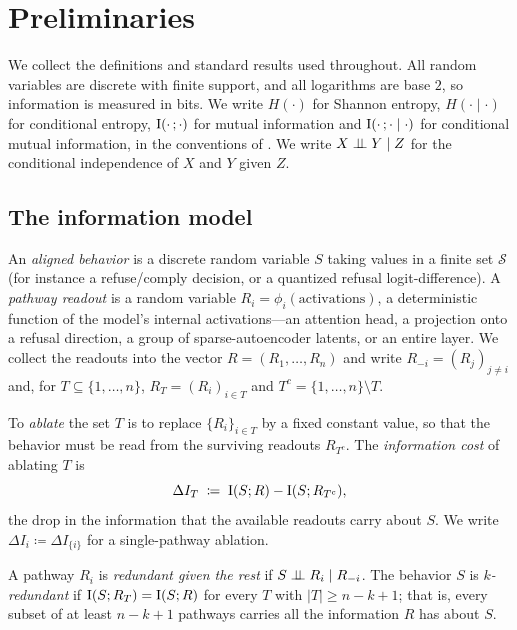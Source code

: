 \section{Preliminaries}
\label{sec:prelim}

We collect the definitions and standard results used throughout. All random
variables are discrete with finite support, and all logarithms are base $2$, so
information is measured in bits. We write $H(\cdot)$ for Shannon entropy,
$H(\cdot\mid\cdot)$ for conditional entropy, $\operatorname{I}(\cdot\,;\cdot)$ for mutual
information and $\operatorname{I}(\cdot\,;\cdot\mid\cdot)$ for conditional mutual information, in
the conventions of \cite{cover2006elements}. We write $X\perp\!\!\!\perp Y\mid Z$ for the
conditional independence of $X$ and $Y$ given $Z$.

\subsection{The information model}

\begin{definition}
\label{def:behavior}
An \emph{aligned behavior} is a discrete random variable $S$ taking values in a finite
set $\mathcal{S}$ (for instance a refuse/comply decision, or a quantized
refusal logit-difference). A \emph{pathway readout} is a random variable
$R_i=\phi_i(\text{activations})$, a deterministic function of the model's internal
activations---an attention head, a projection onto a refusal direction, a group of
sparse-autoencoder latents, or an entire layer. We collect the readouts into the
vector $R=(R_1,\dots,R_n)$ and write $R_{-i}=(R_j)_{j\neq i}$ and, for $T\subseteq
\{1,\dots,n\}$, $R_T=(R_i)_{i\in T}$ and $T^c=\{1,\dots,n\}\setminus T$.
\end{definition}

\begin{definition}
\label{def:ablation}
To \emph{ablate} the set $T$ is to replace $\{R_i\}_{i\in T}$ by a fixed constant
value, so that the behavior must be read from the surviving readouts $R_{T^c}$. The
\emph{information cost} of ablating $T$ is
\[
  \Delta I_T \;\coloneqq\; \operatorname{I}(S;R) - \operatorname{I}(S;R_{T^c}),
\]
the drop in the information that the available readouts carry about $S$. We write
$\Delta I_i \coloneqq \Delta I_{\{i\}}$ for a single-pathway ablation.
\end{definition}

\begin{definition}
\label{def:redundancy}
A pathway $R_i$ is \emph{redundant given the rest} if $S\perp\!\!\!\perp R_i\mid R_{-i}$. The
behavior $S$ is \emph{$k$-redundant} if $\operatorname{I}(S;R_T)=\operatorname{I}(S;R)$ for every $T$ with
$\lvert T\rvert\ge n-k+1$; that is, every subset of at least $n-k+1$ pathways carries
all the information $R$ has about $S$.
\end{definition}

